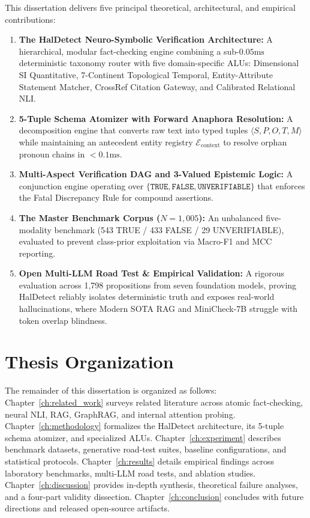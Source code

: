 This dissertation delivers five principal theoretical, architectural, and empirical contributions:
\begin{enumerate}
    \item \textbf{The HalDetect Neuro-Symbolic Verification Architecture:} A hierarchical, modular fact-checking engine combining a sub-$0.05\text{ms}$ deterministic taxonomy router with five domain-specific ALUs: Dimensional SI Quantitative, 7-Continent Topological Temporal, Entity-Attribute Statement Matcher, CrossRef Citation Gateway, and Calibrated Relational NLI.
    \item \textbf{5-Tuple Schema Atomizer with Forward Anaphora Resolution:} A decomposition engine that converts raw text into typed tuples $\langle S, P, O, T, M \rangle$ while maintaining an antecedent entity registry $\mathcal{E}_{\text{context}}$ to resolve orphan pronoun chains in $< 0.1\text{ms}$.
    \item \textbf{Multi-Aspect Verification DAG and 3-Valued Epistemic Logic:} A conjunction engine operating over $\{\texttt{TRUE}, \texttt{FALSE}, \texttt{UNVERIFIABLE}\}$ that enforces the Fatal Discrepancy Rule for compound assertions.
    \item \textbf{The Master Benchmark Corpus ($N = 1{,}005$):} An unbalanced five-modality benchmark (543 TRUE / 433 FALSE / 29 UNVERIFIABLE), evaluated to prevent class-prior exploitation via Macro-F1 and MCC reporting.
    \item \textbf{Open Multi-LLM Road Test \& Empirical Validation:} A rigorous evaluation across 1,798 propositions from seven foundation models, proving HalDetect reliably isolates deterministic truth and exposes real-world hallucinations, where Modern SOTA RAG and MiniCheck-7B struggle with token overlap blindness.
\end{enumerate}

\section{Thesis Organization}
\label{sec:thesis_org}

The remainder of this dissertation is organized as follows: Chapter~\ref{ch:related_work} surveys related literature across atomic fact-checking, neural NLI, RAG, GraphRAG, and internal attention probing. Chapter~\ref{ch:methodology} formalizes the HalDetect architecture, its 5-tuple schema atomizer, and specialized ALUs. Chapter~\ref{ch:experiment} describes benchmark datasets, generative road-test suites, baseline configurations, and statistical protocols. Chapter~\ref{ch:results} details empirical findings across laboratory benchmarks, multi-LLM road tests, and ablation studies. Chapter~\ref{ch:discussion} provides in-depth synthesis, theoretical failure analyses, and a four-part validity dissection. Chapter~\ref{ch:conclusion} concludes with future directions and released open-source artifacts.
